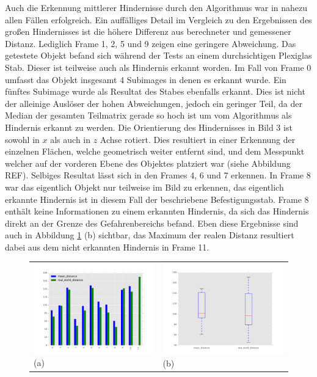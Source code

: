 	\noindent
	Auch die Erkennung mittlerer Hindernisse durch den Algorithmus war in nahezu allen Fällen erfolgreich. Ein auffälliges Detail im Vergleich zu den Ergebnissen des großen Hindernisses ist die höhere Differenz aus berechneter und gemessener Distanz. Lediglich Frame 1, 2, 5 und 9 zeigen eine geringere Abweichung. Das getestete Objekt befand sich während der Tests an einem durchsichtigen Plexiglas Stab. Dieser ist teilweise auch als Hindernis erkannt worden. Im Fall von Frame 0 umfasst das Objekt insgesamt 4 Subimages in denen es erkannt wurde. Ein fünftes Subimage wurde als Resultat des Stabes ebenfalls erkannt. Dies ist nicht der alleinige Auslöser der hohen Abweichungen, jedoch ein geringer Teil, da der Median der gesamten Teilmatrix gerade so hoch ist um vom Algorithmus als Hindernis erkannt zu werden. Die Orientierung des Hindernisses in Bild 3 ist sowohl in $x$ als auch in $z$ Achse rotiert. Dies resultiert in einer Erkennung der einzelnen Flächen, welche geometrisch weiter entfernt sind, und dem Messpunkt welcher auf der vorderen Ebene des Objektes platziert war (siehe Abbildung REF). Selbiges Resultat lässt sich in den Frames 4, 6 und 7 erkennen. In Frame 8 war das eigentlich Objekt nur teilweise im Bild zu erkennen, das eigentlich erkannte Hindernis ist in diesem Fall der beschriebene Befestigungsstab. Frame 8 enthält keine Informationen zu einem erkannten Hindernis, da sich das Hindernis direkt an der Grenze des Gefahrenbereichs befand.	Eben diese Ergebnisse sind auch in Abbildung \ref{fig:eval_medium} (b) sichtbar, das Maximum der realen Distanz resultiert dabei aus dem nicht erkannten Hindernis in Frame 11.
	
	\begin{figure}[h]
		\centering
		\begin{tabular}{m{7.0cm} m{7.0cm}}
		\includegraphics[width=7cm]{img/evaluation/medium_bar}
		\centering \small (a)
		&
		\includegraphics[width=7cm]{img/evaluation/medium_box}
		\centering \small (b)
		\end{tabular}
	    \caption{}
	    \label{fig:eval_medium}
	\end{figure}
	
